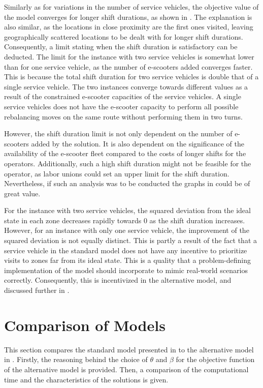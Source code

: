 Similarly as for variations in the number of service vehicles, the objective value of the model converges for longer shift durations, as shown in . The explanation is also similar, as the locations in close proximity are the first ones visited, leaving geographically scattered locations to be dealt with for longer shift durations. Consequently, a limit stating when the shift duration is satisfactory can be deducted. The limit for the instance with two service vehicles is somewhat lower than for one service vehicle, as the number of e-scooters added converges faster. This is because the total shift duration for two service vehicles is double that of a single service vehicle. The two instances converge towards different values as a result of the constrained e-scooter capacities of the service vehicles. A single service vehicles does not have the e-scooter capacity to perform all possible rebalancing moves on the same route without performing them in two turns. 

However, the shift duration limit is not only dependent on the number of e-scooters added by the solution. It is also dependent on the significance of the availability of the e-scooter fleet compared to the costs of longer shifts for the operators. Additionally, such a high shift duration might not be feasible for the operator, as labor unions could set an upper limit for the shift duration. Nevertheless, if such an analysis was to be conducted the graphs in  could be of great value. 

For the instance with two service vehicles, the squared deviation from the ideal state in each zone decreases rapidly towards 0 as the shift duration increases. However, for an instance with only one service vehicle, the improvement of the squared deviation is not equally distinct. This is partly a result of the fact that a service vehicle in the standard model does not have any incentive to prioritize visits to zones far from its ideal state. This is a quality that a problem-defining implementation of the model should incorporate to mimic real-world scenarios correctly. Consequently, this is incentivized in the alternative model, and discussed further in .


\section{Comparison of Models} \label{comp_models}
This section compares the standard model presented in  to the alternative model in . Firstly, the reasoning behind the choice of $\theta$ and $\beta$ for the objective function of the alternative model is provided. Then, a comparison of the computational time and the characteristics of the solutions is given.

